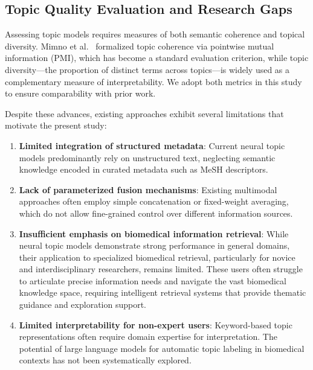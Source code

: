 \documentclass[authorproof,JACIII,researchpaper]{fujipressarticle}
\begin{document}
{\color{red}%
\subsection{Topic Quality Evaluation and Research Gaps}
}%

{\color{red}%
Assessing topic models requires measures of both semantic coherence and topical diversity. Mimno et al.~\cite{mimno_optimizing_2011} formalized topic coherence via pointwise mutual information (PMI), which has become a standard evaluation criterion, while topic diversity---the proportion of distinct terms across topics---is widely used as a complementary measure of interpretability. We adopt both metrics in this study to ensure comparability with prior work.
}%

{\color{red}Despite these advances, existing approaches exhibit several limitations that motivate the present study:}

\begin{enumerate}[leftmargin=*,label=\arabic*)]
    \item \textbf{Limited integration of structured metadata}: Current neural topic models predominantly rely on unstructured text, neglecting semantic knowledge encoded in curated metadata such as MeSH descriptors.

    \item \textbf{Lack of parameterized fusion mechanisms}: Existing multimodal approaches often employ simple concatenation or fixed-weight averaging, which do not allow fine-grained control over different information sources.

    \item \textbf{Insufficient emphasis on biomedical information retrieval}: While neural topic models demonstrate strong performance in general domains, their application to specialized biomedical retrieval, particularly for novice and interdisciplinary researchers, remains limited. These users often struggle to articulate precise information needs and navigate the vast biomedical knowledge space, requiring intelligent retrieval systems that provide thematic guidance and exploration support.

    \item \textbf{Limited interpretability for non-expert users}: Keyword-based topic representations often require domain expertise for interpretation. The potential of large language models for automatic topic labeling in biomedical contexts has not been systematically explored.
\end{enumerate}
\end{document}
